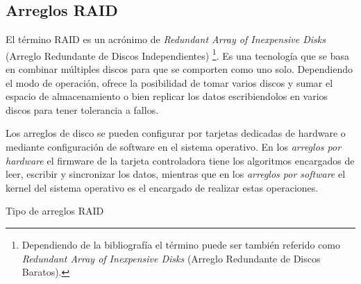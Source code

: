   \subsection {Arreglos RAID}

El t\'{e}rmino RAID es un acr\'{o}nimo de \emph{Redundant Array of Inexpensive Disks} (Arreglo Redundante de Discos Independientes) \cite{8810bc4904cabf93eede72a03c171b7e} \footnote{Dependiendo de la bibliograf\'{i}a el t\'{e}rmino puede ser tambi\'{e}n referido como \emph{Redundant Array of Inexpensive Disks} (Arreglo Redundante de Discos Baratos).}. Es una tecnolog\'{i}a que se basa en combinar m\'{u}ltiples discos para que se comporten como uno solo. Dependiendo el modo de operaci\'{o}n, ofrece la posibilidad de tomar varios discos y sumar el espacio de almacenamiento o bien replicar los datos escribiendolos en varios discos para tener tolerancia a fallos.

Los arreglos de disco se pueden configurar por tarjetas dedicadas de hardware o mediante configuraci\'{o}n de software en el sistema operativo. En los \emph{arreglos por hardware} el firmware de la tarjeta controladora tiene los algoritmos encargados de leer, escribir y sincronizar los datos, mientras que en los \emph{arreglos por software} el kernel del sistema operativo es el encargado de realizar estas operaciones.

Tipo de arreglos RAID


